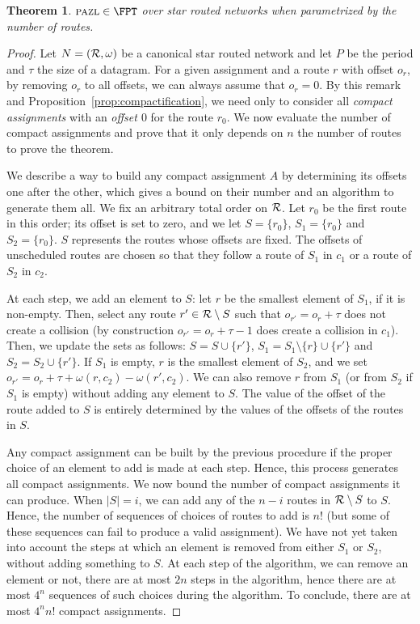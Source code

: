 \documentclass[a4paper,10pt]{journal}
\newtheorem{theorem}{Theorem}
\newcommand\pazl{\textsc{pazl}\xspace}
\begin{document}
\begin{theorem}\label{th:FPT}
$\pazl \in \FPT$ over star routed networks when parametrized by the number of routes.
\end{theorem}
\begin{proof}
Let $N = ({\cal R},\omega)$ be a canonical star routed network and let $P$ be the period and $\tau$ the size of a datagram. For a given assignment and a route $r$ with offset $o_r$, by removing $o_r$ to all offsets, we can always assume that $o_r = 0$. By this remark and Proposition~\ref{prop:compactification}, we need only to consider all \emph{compact assignments} with an \emph{offset $0$} for the route $r_0$. We now evaluate the number of compact assignments and prove that it only depends on $n$ the number of routes to prove the theorem.

 We describe a way to build any compact assignment $A$ by determining its offsets one after the other, which gives a bound on their number and an algorithm to generate them all. We fix an arbitrary total order on ${\cal R}$. Let $r_0$ be the first route in this order; its offset is set to zero, and we let $S = \{r_0\}$,
 $S_1 = \{r_0\}$ and $S_2 = \{r_0\}$. $S$ represents the routes whose offsets are fixed. The offsets of unscheduled routes are chosen so that they follow a route of $S_1$ in $c_1$ or a route of $S_2$ in $c_2$.

 At each step, we add an element to $S$: let $r$ be the smallest element of $S_1$, if it is non-empty. Then, select any route $r' \in {\cal R} \setminus S$ 
 such that $o_{r'} = o_{r} + \tau$ does not create a collision (by construction $o_{r'} = o_{r} + \tau - 1$ does create a collision in $c_1$). Then, we update the sets as follows:
 $S = S \cup \{r'\}$, $S_1 = S_1 \setminus \{r\} \cup \{r'\}$ and $S_2 = S_2 \cup \{r'\}$. If 
 $S_1$ is empty, $r$ is the smallest element of $S_2$, and we set $o_{r'} = o_{r} + \tau + \omega(r,c_2) - \omega(r',c_2)$.
 We can also remove $r$ from $S_1$ (or from $S_2$ if $S_1$ is empty) without adding any element to $S$. The value of the offset of the route added to $S$ is entirely determined by the values of the offsets of the routes in $S$.

 Any compact assignment can be built by the previous procedure if the proper choice of an element to add is made at each step. Hence, this process generates all compact assignments. We now bound the number of compact assignments it can produce. When $|S| = i$, we can add any of the $n-i$ routes in ${\cal R} \setminus S$ to $S$. Hence, the number of sequences of choices of routes to add is $n!$ (but some of these sequences can fail to produce a valid assignment). We have not yet taken into account the steps at which an element is removed from either $S_1$ or $S_2$, without adding something to $S$. At each step of the algorithm, we can remove an element or not, there are at most $2n$ steps in the algorithm, hence there are at most $4^n$ sequences of such choices during the algorithm. To conclude, there are at most $4^nn!$ compact assignments.


\end{proof}
\end{document}
